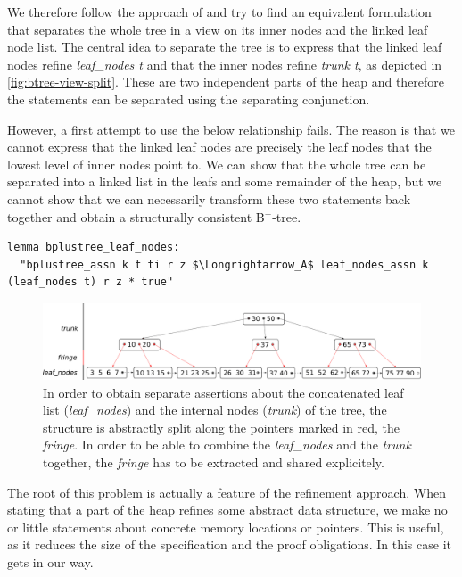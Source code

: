 \documentclass[a4paper,UKenglish,cleveref, autoref, thm-restate]{lipics-v2021}
\newcommand{\btree}{B$^+$-tree}
\begin{document}
We therefore follow the approach of \cite{DBLP:conf/popl/MalechaMSW10} and
try to find an equivalent formulation that separates the whole tree in a
view on its inner nodes and the linked leaf node list.
The central idea to separate the tree is to
express that the linked leaf nodes refine \emph{leaf\_nodes t}
and that the inner nodes refine \emph{trunk t}, as depicted in \autoref{fig:btree-view-split}.
These are two independent parts of the heap and therefore
the statements can be separated using the separating conjunction.

However, a first attempt to use the below relationship fails.
The reason is that we cannot express that the linked leaf nodes
are precisely the leaf nodes that the lowest level of inner nodes point to.
We can show that the whole tree can be separated into a linked list in the leafs
and some remainder of the heap, but we cannot show that we can necessarily transform
these two statements back together and obtain a structurally consistent \btree.

\begin{lstlisting}[mathescape=true, language=Isabelle,label=lst:btree-view-split-oneway]
lemma bplustree_leaf_nodes:
  "bplustree_assn k t ti r z $\Longrightarrow_A$ leaf_nodes_assn k (leaf_nodes t) r z * true"
\end{lstlisting}

\begin{figure}
    \centering
    \includegraphics[width=1\linewidth]{btree-view-split.pdf}
    \caption[Split view of the \btree]
    {In order to obtain separate assertions about the concatenated leaf list (\emph{leaf\_nodes})
    and the internal nodes (\emph{trunk}) of the tree, the structure is abstractly split along the
    pointers marked in red, the \emph{fringe}. In order to be able to combine the \emph{leaf\_nodes} and the \emph{trunk} together,
    the \emph{fringe} has to be extracted and shared explicitely.}
    \label{fig:btree-view-split}
\end{figure}

The root of this problem is actually a feature of the refinement approach.
When stating that a part of the heap
refines some abstract data structure,
we make no or little statements about concrete memory locations or pointers.
This is useful, as it reduces the size of the specification
and the proof obligations.
In this case it gets in our way.
\end{document}
